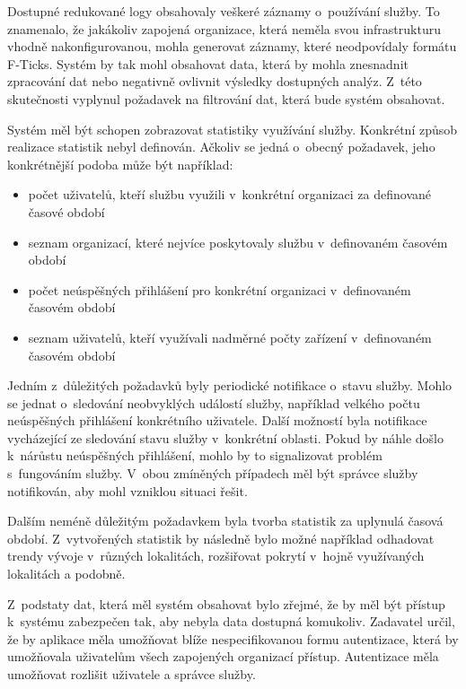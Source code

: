 \documentclass[thesis=M,czech]{FITthesis}[2012/06/26]
\begin{document}
    Dostupné redukované logy obsahovaly veškeré záznamy o~používání služby.
    To znamenalo, že jakákoliv zapojená organizace, která neměla svou infrastrukturu
    vhodně nakonfigurovanou, mohla generovat záznamy, které neodpovídaly formátu F-Ticks.
    Systém by tak mohl obsahovat data, která by mohla znesnadnit zpracování dat nebo negativně ovlivnit
    výsledky dostupných analýz.
    Z~této skutečnosti vyplynul požadavek na filtrování dat, která bude systém obsahovat.

    Systém měl být schopen zobrazovat statistiky využívání služby.
    Konkrétní způsob realizace statistik nebyl definován.
    Ačkoliv se jedná o~obecný požadavek, jeho konkrétnější podoba
    může být například:

    \begin{itemize}
      \item{počet uživatelů, kteří službu využili v~konkrétní organizaci za definované časové období}
      \item{seznam organizací, které nejvíce poskytovaly službu v~definovaném časovém období}
      \item{počet neúspěšných přihlášení pro konkrétní organizaci v~definovaném časovém období} 
      \item{seznam uživatelů, kteří využívali nadměrné počty zařízení v~definovaném časovém období}
    \end{itemize}
    
    Jedním z~důležitých požadavků byly periodické notifikace o~stavu služby.
    Mohlo se jednat o~sledování neobvyklých událostí služby,
    například velkého počtu neúspěšných přihlášení konkrétního uživatele.
    Další možností byla notifikace vycházející ze sledování 
    stavu služby v~konkrétní oblasti. 
    Pokud by náhle došlo k~nárůstu neúspěšných přihlášení, 
    mohlo by to signalizovat problém s~fungováním služby.
    V~obou zmíněných případech měl být správce služby notifikován,
    aby mohl vzniklou situaci řešit.

    Dalším neméně důležitým požadavkem byla tvorba statistik za uplynulá časová období.
    Z~vytvořených statistik by následně bylo možné například odhadovat
    trendy vývoje v~různých lokalitách, 
    rozšiřovat pokrytí v~hojně využívaných lokalitách a podobně.

    Z~podstaty dat, která měl systém obsahovat bylo zřejmé,
    že by měl být přístup k~systému zabezpečen tak, aby nebyla data dostupná komukoliv.
    Zadavatel určil, že by aplikace měla umožňovat blíže nespecifikovanou formu autentizace, 
    která by umožňovala uživatelům všech zapojených organizací přístup.
    Autentizace měla umožňovat rozlišit uživatele a správce služby.
\end{document}
